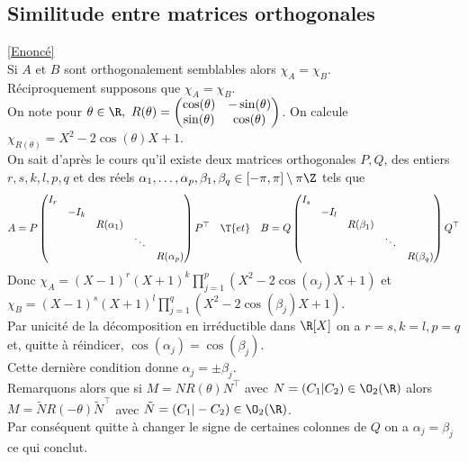 \documentclass[8pt]{book}
\begin{document}
	\subsection{Similitude entre matrices orthogonales }
	\label{Similitude entre matrices orthogonales corrigé}
	\textcolor{blue}{\hyperref[Similitude entre matrices orthogonales]{[Enoncé]}}\\
	Si $A$ et $B$ sont orthogonalement semblables alors $\chi_A=\chi_B$.\\
	Réciproquement supposons que $\chi_A=\chi_B$.\\
	On note pour $\theta\in \R,\ R(\theta)=\begin{pmatrix}
		\cos(\theta)&-\sin(\theta)\\
		\sin(\theta)&\cos(\theta)
	\end{pmatrix}$. On calcule $\chi_{R(\theta)}=X^2-2\cos(\theta)X+1$.\\
	On sait d'après le cours qu'il existe deux matrices orthogonales $P,Q$, des entiers $r,s,k,l,p,q$ et des réels $\alpha_1,\dots,\alpha_p,\beta_1,\beta_q\in[-\pi,\pi]\setminus\pi\Z$ tels que
	$$A=P\begin{pmatrix}
		I_r&&&\\
		&-I_k&&\\
		&&R(\alpha_1)&&\\
		&&&\ddots&\\
		&&&&R(\alpha_p)
	\end{pmatrix}P^\top\quad \T{et}\quad B=Q\begin{pmatrix}
		I_s&&&\\
		&-I_l&&\\
		&&R(\beta_1)&&\\
		&&&\ddots&\\
		&&&&R(\beta_q)
	\end{pmatrix}Q^\top$$
	Donc $\chi_A=(X-1)^r(X+1)^k\displaystyle\prod_{j=1}^p(X^2-2\cos(\alpha_j)X+1)$ et $\chi_B=(X-1)^s(X+1)^l\displaystyle\prod_{j=1}^q(X^2-2\cos(\beta_j)X+1)$.\\
	Par unicité de la décomposition en irréductible dans $\R[X]$ on a $r=s,k=l,p=q$ et, quitte à réindicer, $\cos(\alpha_j)=\cos(\beta_j)$.\\
	Cette dernière condition donne $\alpha_j=\pm\beta_j$.\\
	Remarquons alors que si $M=NR(\theta)N^\top$ avec $N=(C_1|C_2)\in \O_2(\R)$ alors $M=\tilde NR(-\theta){\tilde N}^\top$ avec $\tilde N=(C_1|-C_2)\in \O_2(\R)$.\\
	Par conséquent quitte à changer le signe de certaines colonnes de $Q$ on a $\alpha_j=\beta_j$ ce qui conclut.
	
\end{document}
